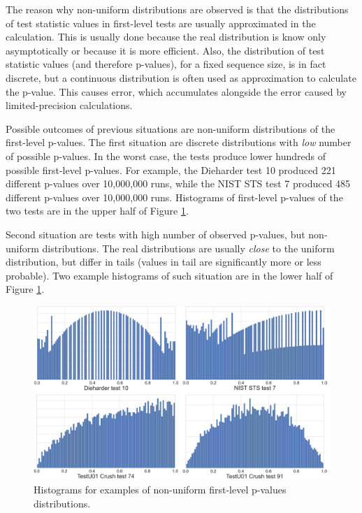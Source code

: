 \documentclass[
  digital,     %
  oneside,     %
  nosansbold,  %
  nocolorbold, %
  nolof,         %
  nolot,         %
]{fithesis4}
\begin{document}
The reason why non-uniform distributions are observed is that the distributions of test statistic values in first-level tests are usually approximated in the calculation. This is usually done because the real distribution is know only asymptotically or because it is more efficient. Also, the distribution of test statistic values (and therefore p-values), for a fixed sequence size, is in fact discrete, but a continuous distribution is often used as approximation to calculate the p-value. This causes error, which accumulates alongside the error caused by limited-precision calculations. \cite[p. 7]{bad_day}

Possible outcomes of previous situations are non-uniform distributions of the first-level p-values. The first situation are discrete distributions with \emph{low} number of possible p-values. In the worst case, the tests produce lower hundreds of possible first-level p-values. For example, the Dieharder test 10 produced 221 different p-values over 10,000,000 runs, while the NIST STS test 7 produced 485 different p-values over 10,000,000 runs. Histograms of first-level p-values of the two tests are in the upper half of Figure \ref{fig:uniforms}.

Second situation are tests with high number of observed p-values, but non-uniform distributions. The real distributions are usually \emph{close} to the uniform distribution, but differ in tails (values in tail are significantly more or less probable). Two example histograms of such situation are in the lower half of Figure \ref{fig:uniforms}.

\begin{figure}[h]
  \begin{center}
    \includegraphics[width=12.5cm]{figures/uniformity.png}
  \end{center}
  \caption{Histograms for examples of non-uniform first-level p-values distributions.}
  \label{fig:uniforms}
\end{figure}
\end{document}
